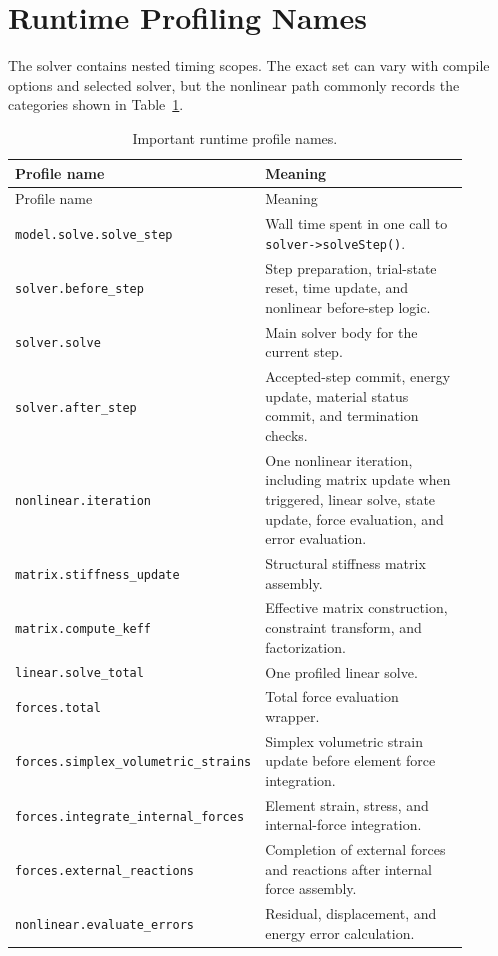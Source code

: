 \documentclass[11pt,a4paper]{article}
\newcommand{\code}[1]{\ifmmode\text{\texttt{\detokenize{#1}}}\else\nolinkurl{#1}\fi}
\begin{document}
\section{Runtime Profiling Names}

The solver contains nested timing scopes.  The exact set can vary with compile
options and selected solver, but the nonlinear path commonly records the
categories shown in Table~\ref{tab:runtime-phases}.

\begin{longtable}{p{0.34\linewidth} p{0.56\linewidth}}
\caption{Important runtime profile names.}
\label{tab:runtime-phases}\\
\toprule
Profile name & Meaning \\
\midrule
\endfirsthead
\toprule
Profile name & Meaning \\
\midrule
\endhead
\code{model.solve.solve_step} &
Wall time spent in one call to \code{solver->solveStep()}. \\

\code{solver.before_step} &
Step preparation, trial-state reset, time update, and nonlinear before-step
logic. \\

\code{solver.solve} &
Main solver body for the current step. \\

\code{solver.after_step} &
Accepted-step commit, energy update, material status commit, and termination
checks. \\

\code{nonlinear.iteration} &
One nonlinear iteration, including matrix update when triggered, linear solve,
state update, force evaluation, and error evaluation. \\

\code{matrix.stiffness_update} &
Structural stiffness matrix assembly. \\

\code{matrix.compute_keff} &
Effective matrix construction, constraint transform, and factorization. \\

\code{linear.solve_total} &
One profiled linear solve. \\

\code{forces.total} &
Total force evaluation wrapper. \\

\code{forces.simplex_volumetric_strains} &
Simplex volumetric strain update before element force integration. \\

\code{forces.integrate_internal_forces} &
Element strain, stress, and internal-force integration. \\

\code{forces.external_reactions} &
Completion of external forces and reactions after internal force assembly. \\

\code{nonlinear.evaluate_errors} &
Residual, displacement, and energy error calculation. \\
\bottomrule
\end{longtable}
\end{document}
